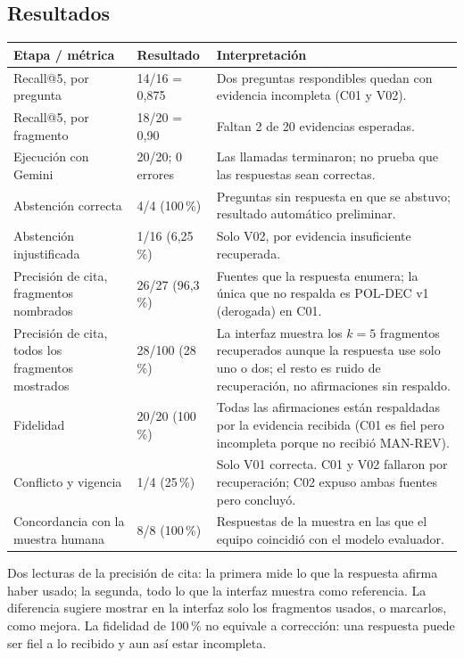 \documentclass[11pt,a4paper]{article}
\newcommand{\cab}{\rowcolor{azulmira!14}}
\newcommand{\tabla}{\small\rowcolors{2}{white}{grisclaro}}
\begin{document}
\subsection{Resultados}
\begin{center}\tabla
\begin{tabularx}{\textwidth}{@{}p{3.3cm}p{3.6cm}Y@{}}
\toprule
\cab\textbf{Etapa / métrica} & \textbf{Resultado} & \textbf{Interpretación}\\
\midrule
Recall@5, por pregunta & 14/16 = 0,875 & Dos preguntas respondibles quedan con evidencia incompleta (C01 y V02).\\
Recall@5, por fragmento & 18/20 = 0,90 & Faltan 2 de 20 evidencias esperadas.\\
Ejecución con Gemini & 20/20; 0 errores & Las llamadas terminaron; no prueba que las respuestas sean correctas.\\
Abstención correcta & 4/4 (100\,\%) & Preguntas sin respuesta en que se abstuvo; resultado automático preliminar.\\
Abstención injustificada & 1/16 (6,25\,\%) & Solo V02, por evidencia insuficiente recuperada.\\
Precisión de cita, fragmentos nombrados & 26/27 (96,3\,\%) & Fuentes que la respuesta enumera; la única que no respalda es POL-DEC v1 (derogada) en C01.\\
Precisión de cita, todos los fragmentos mostrados & 28/100 (28\,\%) & La interfaz muestra los $k=5$ fragmentos recuperados aunque la respuesta use solo uno o dos; el resto es ruido de recuperación, no afirmaciones sin respaldo.\\
Fidelidad & 20/20 (100\,\%) & Todas las afirmaciones están respaldadas por la evidencia recibida (C01 es fiel pero incompleta porque no recibió MAN-REV).\\
Conflicto y vigencia & 1/4 (25\,\%) & Solo V01 correcta. C01 y V02 fallaron por recuperación; C02 expuso ambas fuentes pero concluyó.\\
Concordancia con la muestra humana & 8/8 (100\,\%) & Respuestas de la muestra en las que el equipo coincidió con el modelo evaluador.\\
\bottomrule
\end{tabularx}
\end{center}
Dos lecturas de la precisión de cita: la primera mide lo que la respuesta afirma haber usado; la segunda, todo lo que la interfaz muestra como referencia. La diferencia sugiere mostrar en la interfaz solo los fragmentos usados, o marcarlos, como mejora. La fidelidad de 100\,\% no equivale a corrección: una respuesta puede ser fiel a lo recibido y aun así estar incompleta.
\end{document}
